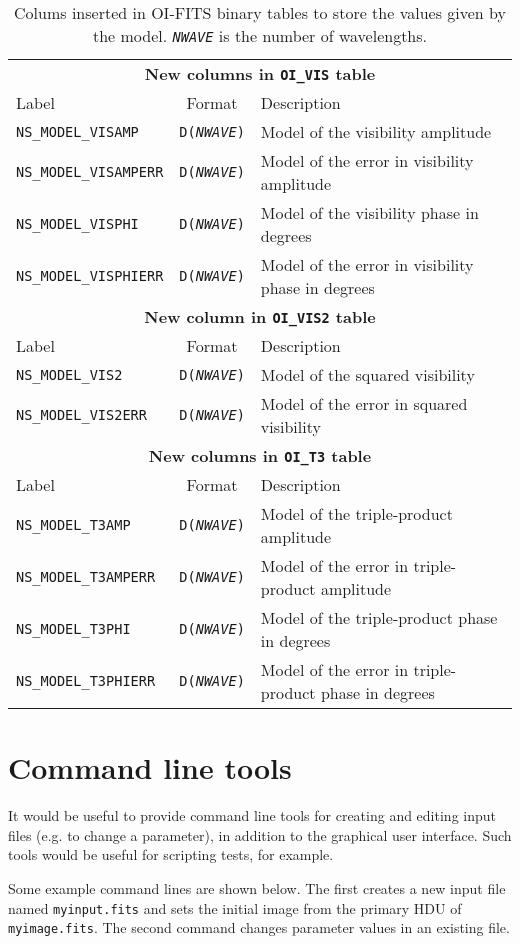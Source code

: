 \documentclass{article}
\newcommand*{\ROW}{} %
\newcommand*{\ROWTITLE}{} %
\newcommand{\oops}[1]{\DarkRed{#1}}
\begin{document}
\renewcommand{\ROW}[2]{\texttt{#1} & \texttt{D(\textsl{NWAVE})} & #2 \\}
\renewcommand{\ROWTITLE}[1]{\multicolumn{3}{c}{\textbf{#1}}\\}

\begin{table}
\caption{Colums inserted in OI-FITS binary tables to store the values given by
the model.  \texttt{\textsl{NWAVE}} is the number of wavelengths.
\label{tab:model-columns}}
\begin{tabular}{lcl}
\hline
\hline
\ROWTITLE{New columns in \texttt{OI\_VIS} table}
Label & Format & Description \\
\hline
\ROW{NS\_MODEL\_VISAMP}{Model of the visibility amplitude}
\ROW{NS\_MODEL\_VISAMPERR}{Model of the error in visibility amplitude \oops{(optional)}}
\ROW{NS\_MODEL\_VISPHI}{Model of the visibility phase in degrees}
\ROW{NS\_MODEL\_VISPHIERR}{Model of the error in visibility phase in degrees \oops{(optional)}}
\hline
\hline
\ROWTITLE{New column in \texttt{OI\_VIS2} table}
Label & Format & Description \\
\hline
\ROW{NS\_MODEL\_VIS2}{Model of the squared visibility}
\ROW{NS\_MODEL\_VIS2ERR}{Model of the error in squared visibility \oops{(optional)}}
\hline
\hline
\ROWTITLE{New columns in \texttt{OI\_T3} table}
Label & Format & Description \\
\hline
\ROW{NS\_MODEL\_T3AMP}{Model of the triple-product amplitude}
\ROW{NS\_MODEL\_T3AMPERR}{Model of the error in triple-product amplitude \oops{(optional)}}
\ROW{NS\_MODEL\_T3PHI}{Model of the triple-product phase in degrees}
\ROW{NS\_MODEL\_T3PHIERR}{Model of the error in triple-product phase in degrees \oops{(optional)}}
\hline
\end{tabular}
\end{table}

\section{Command line tools}

It would be useful to provide command line tools for creating and
editing input files (e.g. to change a parameter), in addition to the
graphical user interface. Such tools would be useful for scripting
tests, for example.

Some example command lines are shown below. The first creates a new input
file named \verb+myinput.fits+ and sets the initial image from the
primary HDU of \verb+myimage.fits+. The second command changes
parameter values in an existing file.
\end{document}
